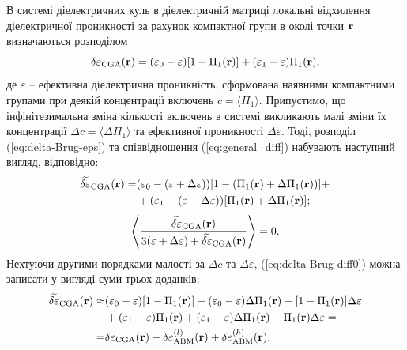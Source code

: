 \documentclass[14pt,twoside]{vakthesis}
\begin{document}


В системі діелектричних куль в діелектричній матриці локальні відхилення діелектричної проникності за рахунок компактної групи в околі точки $\bf r$ визначаються розподілом
\begin{equation}\label{eq:delta-Brug-eps}
\delta{\varepsilon}_{\rm CGA} ({\bf r}) = (\varepsilon_0 - \varepsilon) [1 - \Pi_1 ({\bf r})] + (\varepsilon_1 - \varepsilon) \Pi_1 ({\bf r}),
\end{equation}
де $\varepsilon$ -- ефективна діелектрична проникність, сформована наявними компактними групами при деякій концентрації включень $c = \langle \Pi_1 \rangle$. Припустимо, що інфінітезимальна зміна кількості включень в системі викликають малі зміни їх концентрації $\Delta c = \langle \Delta\Pi_1 \rangle$ та ефективної проникності $\Delta\varepsilon$. Тоді, розподіл (\ref{eq:delta-Brug-eps}) та співвідношення (\ref{eq:general_diff}) набувають наступний вигляд, відповідно:
\begin{equation}\label{eq:delta-Brug-diff0}
\begin{split}
\widetilde{\delta\varepsilon}_{\rm CGA} ({\bf r}) =& (\varepsilon_0 - (\varepsilon + \Delta\varepsilon)) [1 - (\Pi_1 ({\bf r}) + \Delta\Pi_1 ({\bf r}))] +\\
&+ (\varepsilon_1 - (\varepsilon +   \Delta\varepsilon)) [\Pi_1 ({\bf r}) + \Delta\Pi_1 ({\bf r})];
\end{split}
\end{equation}
\begin{equation}\label{eq:general_diff-tilde}
\left\langle \frac{\widetilde{\delta\varepsilon}_{\rm CGA}({\bf r})}{3(\varepsilon + \Delta\varepsilon) + \widetilde{\delta\varepsilon}_{\rm CGA}({\bf r})} \right\rangle = 0.
\end{equation}
Нехтуючи другими порядками малості за $\Delta c$ та $\Delta\varepsilon$, (\ref{eq:delta-Brug-diff0}) можна записати у вигляді суми трьох доданків:
\begin{equation}\label{eq:delta-Brug-diff}
\begin{split}
\widetilde{\delta\varepsilon}_{\rm CGA} ({\bf r}) 
\approx& (\varepsilon_0 - \varepsilon) [1 - \Pi_1 ({\bf r})] - (\varepsilon_0 - \varepsilon)  \Delta\Pi_1 ({\bf r}) -  [1 - \Pi_1 ({\bf r})]\Delta\varepsilon \\
&+ (\varepsilon_1 - \varepsilon) \Pi_1 ({\bf r}) + (\varepsilon_1 - \varepsilon) \Delta\Pi_1 ({\bf r}) -  \Pi_1 ({\bf r}) \Delta\varepsilon = \\
=& \delta\varepsilon_{\rm CGA} ({\bf r}) + \delta\varepsilon_{\rm ABM}^{(l)} ({\bf r}) + \delta\varepsilon_{\rm ABM}^{(h)} ({\bf r}),
\end{split}
\end{equation}
\end{document}
